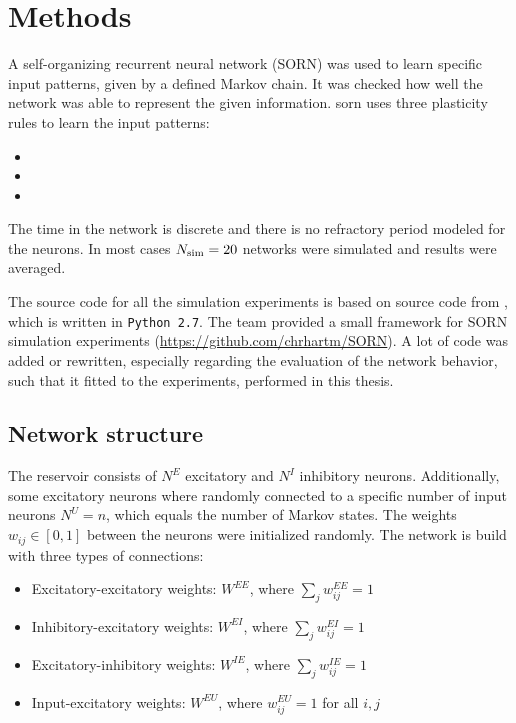 \section{Methods}
\label{sec:methods}

A self-organizing recurrent neural network (SORN) was used to learn specific input patterns, given by a defined Markov chain. It was checked how well the network was able to represent the given information. \acs{sorn} uses three plasticity rules to learn the input patterns:

\begin{itemize}
\item {}
\item {}
\item {}
\end{itemize}

The time in the network is discrete and there is no refractory period modeled for the neurons. In most cases $N_{\text{sim}} = 20$ networks were simulated and results were averaged.


The source code for all the simulation experiments is based on source code from \textcite{hartmann2015s}, which is written in \texttt{Python 2.7}. The team provided a small framework for SORN simulation experiments (\href{https://github.com/chrhartm/SORN}{https://github.com/chrhartm/SORN}). A lot of code was added or rewritten, especially regarding the evaluation of the network behavior, such that it fitted to the experiments, performed in this thesis.

\subsection{Network structure}

The reservoir consists of $N^E$ excitatory and $N^I$ inhibitory neurons. Additionally, some excitatory neurons where randomly connected to a specific number of input neurons $N^U = n$, which equals the number of Markov states. The weights $w_{ij} \in [0,1]$ between the neurons were initialized randomly. The network is build with three types of connections:

\begin{itemize}
\item Excitatory-excitatory weights: $W^{EE}$, where $\sum_{j} w^{EE}_{ij} = 1$
\item Inhibitory-excitatory weights: $W^{EI}$, where $\sum_{j} w^{EI}_{ij} = 1$
\item Excitatory-inhibitory weights: $W^{IE}$, where $\sum_{j} w^{IE}_{ij} = 1$
\item Input-excitatory weights: $W^{EU}$, where $w^{EU}_{ij} = 1$ for all $i,j$
\end{itemize}

